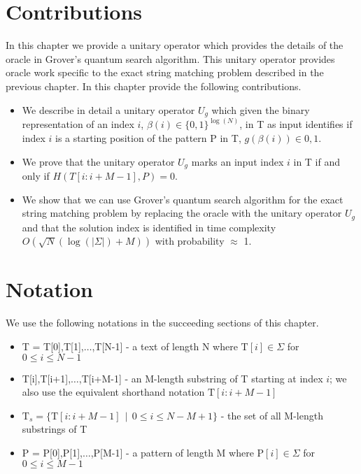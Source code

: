 \section{Contributions}
In this chapter we provide a unitary operator which provides the details of the oracle in Grover's quantum search algorithm. This unitary operator provides oracle work specific to the exact string matching problem described in the previous chapter. In this chapter provide the following contributions.
\begin{itemize}
	\item We describe in detail a unitary operator $U_{g}$ which given the binary representation of an index $i$, $\beta(i) \in \{0,1\}^{\log(N)}$, in T as input identifies if index $i$ is a starting position of the pattern P in T, $g(\beta(i)) \in {0,1}$.
	\item We prove that the unitary operator $U_{g}$ marks an input index $i$ in T if and only if $H\left(T[i:i+M-1],P\right) = 0$.
	\item We show that we can use Grover's quantum search algorithm for the exact string matching problem by replacing the oracle with the unitary operator $U_{g}$ and that the solution index is identified in time complexity $O\left(\sqrt{N}\left(\log(\vert\Sigma\vert) + M\right)\right)$ with probability $\approx$ 1.
\end{itemize}

















\section{Notation}
We use the following notations in the succeeding sections of this chapter.
\begin{itemize}
	\item T = T[0],T[1],$\ldots$,T[N-1] - a text of length N where $\text{T}[i] \in \Sigma$ for $0 \leq i \leq N-1$
	\item T[i],T[i+1],$\ldots$,T[i+M-1] - an M-length substring of T starting at index $i$; we also use the equivalent shorthand notation $\text{T}[i:i+M-1]$
	\item $\text{T}_{s} = \{\text{T}[i:i+M-1]\ \ \vert\ \ 0 \leq i \leq N-M+1 \}$ - the set of all M-length substrings of T
	\item P = P[0],P[1],$\ldots$,P[M-1] - a pattern of length M where $\text{P}[i] \in \Sigma$ for $0 \leq i \leq M-1$
\end{itemize}

